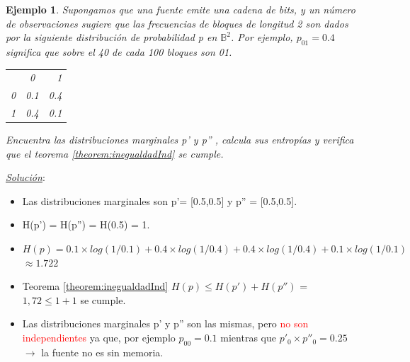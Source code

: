 \documentclass{beamer}
\theoremstyle{plain}
\theoremstyle{example}
\theoremstyle{example}
\newtheorem{ejemplo} [Ejemplo] {Ejemplo}
\begin{document}
\begin{frame}  \footnotesize
\begin{ejemplo}
Supongamos que una fuente emite una cadena de bits, y un número de observaciones sugiere que las frecuencias de bloques de longitud 2 son dados por la siguiente distribución de probabilidad p en $\mathbb{B}^2$. Por ejemplo, $p_{01}=0.4$ significa  que sobre el 40 de cada 100  bloques son 01.

\begin{center}
 \begin{tabular}{ l c r }
         & 0 & 1 \\
   0 & 0.1 & 0.4 \\
   1 & 0.4 & 0.1 \\
 \end{tabular}
\end{center}

Encuentra las distribuciones marginales p' y p'' , calcula sus entropías y verifica que el teorema \ref{theorem:inegualdadInd} se cumple.\\
\end{ejemplo}
\pause

\textit{\underline{Solución}}:\\
\begin{itemize}
\item Las distribuciones marginales son p'= [0.5,0.5] y p'' = [0.5,0.5]. 
\item H(p') = H(p'') = H(0.5) = 1. 
\item $H(p) = 0.1 \times log(1/0.1) + 0.4  \times log(1/0.4) + 0.4  \times log(1/0.4) + 0.1  \times log(1/0.1) $ $ \approx 1.722$

\item Teorema \ref{theorem:inegualdadInd} $H(p) \leq H(p')+H(p'')$  = $1,72 \leq  1 + 1$ se cumple. 

\item Las distribuciones marginales p' y p'' son las mismas, pero \textcolor{red}{no son independientes}  ya que, por ejemplo $p_{00} =0.1$ mientras que $p'_0 \times p''_0=0.25$ $\rightarrow$ la fuente no es sin memoria.%

\end{itemize}

\end{frame} 


\end{document}
